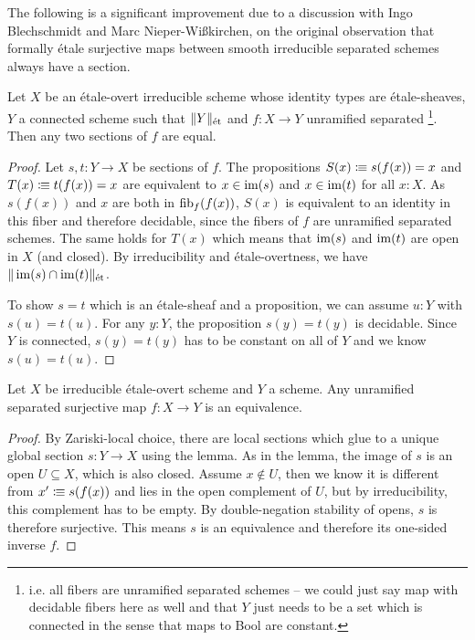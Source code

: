The following is a significant improvement due to a discussion with Ingo Blechschmidt and Marc Nieper-Wißkirchen, on the original observation that formally étale surjective maps between smooth irreducible separated schemes always have a section.

\begin{lemma}
  Let $X$ be an étale-overt irreducible scheme whose identity types are étale-sheaves, $Y$ a connected scheme such that $\|Y\|_\et$ and $f:X\to Y$ unramified separated
  \footnote{i.e. all fibers are unramified separated schemes -- we could just say map with decidable fibers here as well and that $Y$ just needs to be a set which is connected in the sense that maps to Bool are constant.}.
  Then any two sections of $f$ are equal.
\end{lemma}

\begin{proof}
  Let $s,t:Y\to X$ be sections of $f$.
  The propositions $S(x)\colonequiv s(f(x))=x$ and $T(x)\colonequiv t(f(x))=x$
  are equivalent to $x\in\im(s)$ and $x\in\im(t)$ for all $x:X$.
  As $s(f(x))$ and $x$ are both in $\fib_f(f(x))$,
  $S(x)$ is equivalent to an identity in this fiber and therefore decidable,
  since the fibers of $f$ are unramified separated schemes.
  The same holds for $T(x)$ which means that $\im(s)$ and $\im(t)$ are open in $X$ (and closed).
  By irreducibility and étale-overtness, we have $\|\im(s)\cap\im(t)\|_\et$.

  To show $s=t$ which is an étale-sheaf and a proposition,
  we can assume $u:Y$ with $s(u)=t(u)$.
  For any $y:Y$, the proposition $s(y)=t(y)$ is decidable.
  Since $Y$ is connected, $s(y)=t(y)$ has to be constant on all of $Y$ and we know $s(u)=t(u)$.
\end{proof}

\begin{proposition}
  Let $X$ be irreducible étale-overt scheme and $Y$ a scheme.
  Any unramified separated surjective map $f:X\to Y$ is an equivalence.
\end{proposition}

\begin{proof}
  By Zariski-local choice, there are local sections which glue to a unique global section $s:Y\to X$ using the lemma.
  As in the lemma, the image of $s$ is an open $U\subseteq X$, which is also closed.
  Assume $x\notin U$, then we know it is different from $x^\prime\colonequiv s(f(x))$ and lies in the open complement of $U$, but by irreducibility, this complement has to be empty.
  By double-negation stability of opens, $s$ is therefore surjective.
  This means $s$ is an equivalence and therefore its one-sided inverse $f$.
\end{proof}


